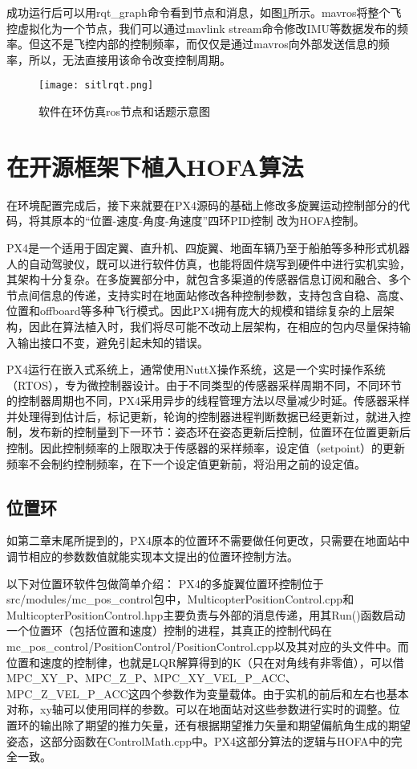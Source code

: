 成功运行后可以用rqt\_graph命令看到节点和消息，如图\ref{sitlrqt}所示。mavros将整个飞控虚拟化为一个节点，我们可以通过mavlink stream命令修改IMU等数据发布的频率。但这不是飞控内部的控制频率，而仅仅是通过mavros向外部发送信息的频率，所以，无法直接用该命令改变控制周期。
\begin{figure}[!h]
  \centering
  \texttt{[image: sitlrqt.png]}
  \caption{软件在环仿真ros节点和话题示意图}
  \label{sitlrqt}
\end{figure}

 \section{在开源框架下植入HOFA算法}
在环境配置完成后，接下来就要在PX4源码的基础上修改多旋翼运动控制部分的代码，将其原本的“位置-速度-角度-角速度”四环PID控制 \cite{px4}改为HOFA控制。

PX4是一个适用于固定翼、直升机、四旋翼、地面车辆乃至于船舶等多种形式机器人的自动驾驶仪，既可以进行软件仿真，也能将固件烧写到硬件中进行实机实验，其架构十分复杂。在多旋翼部分中，就包含多渠道的传感器信息订阅和融合、多个节点间信息的传递，支持实时在地面站修改各种控制参数，支持包含自稳、高度、位置和offboard等多种飞行模式。因此PX4拥有庞大的规模和错综复杂的上层架构，因此在算法植入时，我们将尽可能不改动上层架构，在相应的包内尽量保持输入输出接口不变，避免引起未知的错误。

PX4运行在嵌入式系统上，通常使用NuttX操作系统，这是一个实时操作系统（RTOS），专为微控制器设计。由于不同类型的传感器采样周期不同，不同环节的控制器周期也不同，PX4采用异步的线程管理方法以尽量减少时延。传感器采样并处理得到估计后，标记更新，轮询的控制器进程判断数据已经更新过，就进入控制，发布新的控制量到下一环节：姿态环在姿态更新后控制，位置环在位置更新后控制。因此控制频率的上限取决于传感器的采样频率，设定值（setpoint）的更新频率不会制约控制频率，在下一个设定值更新前，将沿用之前的设定值。

\subsection*{位置环}
如第二章末尾所提到的，PX4原本的位置环不需要做任何更改，只需要在地面站中调节相应的参数数值就能实现本文提出的位置环控制方法。

以下对位置环软件包做简单介绍：
PX4的多旋翼位置环控制位于src/modules/mc\_pos\_control包中，MulticopterPositionControl.cpp和MulticopterPositionControl.hpp主要负责与外部的消息传递，用其Run()函数启动一个位置环（包括位置和速度）控制的进程，其真正的控制代码在mc\_pos\_control/PositionControl/PositionControl.cpp以及其对应的头文件中。而位置和速度的控制律，也就是LQR解算得到的K（只在对角线有非零值），可以借MPC\_XY\_P、MPC\_Z\_P、MPC\_XY\_VEL\_P\_ACC、MPC\_Z\_VEL\_P\_ACC这四个参数作为变量载体。由于实机的前后和左右也基本对称，xy轴可以使用同样的参数。可以在地面站对这些参数进行实时的调整。位置环的输出除了期望的推力矢量，还有根据期望推力矢量和期望偏航角生成的期望姿态，这部分函数在ControlMath.cpp中。PX4这部分算法的逻辑与HOFA中的完全一致。

